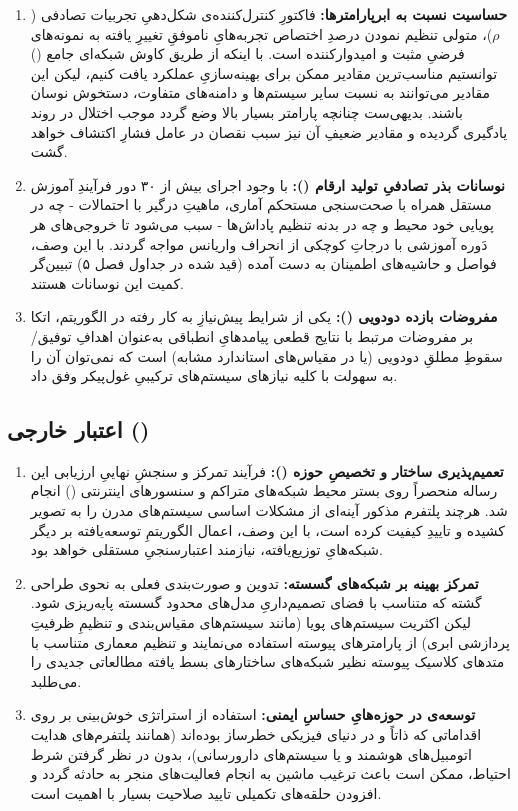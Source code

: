 \documentclass[oneside,openany,phd]{TMU-Thesis}
\begin{document}
\begin{enumerate}
    \item \textbf{حساسیت نسبت به ابرپارامترها:} فاکتورِ کنترل‌کننده‌ی شکل‌دهیِ تجربیات تصادفی ($\rho$)، متولی تنظیم نمودن درصدِ اختصاص تجربه‌هایِ ناموفقِ تغییرِ یافته به نمونه‌های فرضیِ مثبت و امیدوارکننده است. با اینکه از طریق کاوش شبکه‌ای جامع () توانستیم مناسب‌ترین مقادیر ممکن برای بهینه‌سازیِ عملکرد یافت کنیم، لیکن این مقادیر می‌توانند به نسبت سایر سیستم‌ها و دامنه‌های متفاوت، دستخوش نوسان باشند. بدیهی‌ست چنانچه پارامتر بسیار بالا وضع گردد موجب اختلال در روند یادگیری گردیده و مقادیر ضعیفِ آن نیز سبب نقصان در عامل فشارِ اکتشاف خواهد گشت.
    \item \textbf{نوسانات بذر تصادفیِ تولید ارقام ():} با وجود اجرای بیش از ۳۰ دور فرآیندِ آموزش مستقل همراه با صحت‌سنجی مستحکم آماری، ماهیتِ درگیر با احتمالات - چه در پویایی خود محیط و چه در بدنه تنظیم پاداش‌ها - سبب می‌شود تا خروجی‌های هر دَوره آموزشی با درجاتِ کوچکی از انحراف واریانس مواجه گردند. با این وصف، فواصل و حاشیه‌های اطمینان به دست آمده (قید شده در جداول فصل ۵) تبیین‌گر کمیت این نوسانات هستند.
    \item \textbf{مفروضات بازده دودویی ():} یکی از شرایط پیش‌نیازِ به کار رفته در الگوریتم، اتکا بر مفروضات مرتبط با نتایج قطعی پیامدهایِ انطباقی به‌عنوان اهدافِ توفیق/سقوطِ مطلقِ دودویی (یا در مقیاس‌های استاندارد مشابه) است که نمی‌توان آن را به سهولت با کلیه نیازهای سیستم‌های ترکیبیِ غول‌پیکر وفق داد.
\end{enumerate}

\subsection{اعتبار خارجی ()}

\begin{enumerate}
    \item \textbf{تعمیم‌پذیری ساختار و تخصیصِ حوزه ():} فرآیند تمرکز و سنجشِ نهاییِ ارزیابی این رساله منحصراً روی بستر محیط شبکه‌های متراکم و سنسورهای اینترنتی () انجام شد. هرچند پلتفرم مذکور آینه‌ای از مشکلات اساسی سیستم‌های مدرن را به تصویر کشیده و تاییدِ کیفیت کرده است، با این وصف، اعمال الگوریتمِ توسعه‌یافته بر دیگر شبکه‌هایِ توزیع‌یافته، نیازمند اعتبارسنجیِ مستقلی خواهد بود.
    \item \textbf{تمرکز بهینه بر شبکه‌های گسسته:} تدوین و صورت‌بندی فعلی به نحوی طراحی گشته که متناسب با فضای تصمیم‌داریِ مدل‌های محدود گسسته پایه‌ریزی شود. لیکن اکثریت سیستم‌های پویا (مانند سیستم‌های مقیاس‌بندی و تنظیمِ ظرفیتِ پردازشی‌ ابری) از پارامترهای پیوسته استفاده می‌نمایند و تنظیم معماری  متناسب با متدهای کلاسیک پیوسته نظیر شبکه‌های  ساختارهای بسط یافته مطالعاتی جدیدی را می‌طلبد.
    \item \textbf{توسعه‌ی در حوزه‌هایِ حساسِ ایمنی:} استفاده از استراتژی خوش‌بینی بر روی اقداماتی که ذاتاً و در دنیای فیزیکی خطرساز بوده‌اند (همانند پلتفرم‌های هدایت اتومبیل‌های هوشمند و یا سیستم‌های دارورسانی)، بدون در نظر گرفتن شرط احتیاط، ممکن است باعث ترغیب ماشین به انجام فعالیت‌های منجر به حادثه گردد و افزودن حلقه‌های تکمیلی تایید صلاحیت بسیار با اهمیت است.
\end{enumerate}
\end{document}
